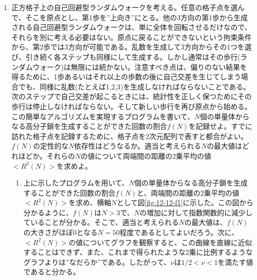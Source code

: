 \documentclass{jsarticle}
\begin{document}
        \begin{enumerate}
            \renewcommand{\labelenumi}{\alph{enumi}.}
            \renewcommand{\labelenumii}{}
            
            \item 正方格子上の自己回避型ランダムウォークを考える。任意の格子点を選んで、そこを原点とし、第1歩を”上向き”にとる。他の3方向の第1歩から生成される自己回避型ランダムウォークは、単に全体を回転させるだけなので、それらを別に考える必要はない。原点に戻ることができないという拘束条件から、第2歩では3方向が可能である。乱数を生成して3方向からその1つを選び、引き続く各ステップも同様にして生成する。しかし通常はその歩行(ランダムウォーク)は無限には続かない。注意すべき点は、偏りのない結果を得るために、1歩あるいはそれ以上の歩数の後に自己交差を生じてしまう場合でも、同様に乱数(たとえば1,2,3)を生成しなければならないことである。次のステップで自己交差が起こるときには、統計性を正しく保つためにその歩行は停止しなければならない。そして新しい歩行を再び原点から始める。この簡単なアルゴリズムを実現するプログラムを書いて、$N$個の単量体からなる高分子鎖を生成することができた回数の割合$f(N)$を記録せよ。すでに訪れた格子点を記録するために、格子点を2次元配列で表すと都合がよい。$f(N)$の定性的な$N$依存性はどうなるか。適当と考えられる$N$の最大値はどれほどか。それらの$N$の値について両端間の距離の2乗平均の値$<R^{2}(N)>$を求めよ。    
                
                \begin{enumerate}
                    \item 上に示したプログラムを用いて、$N$個の単量体からなる高分子鎖を生成することができた回数の割合$f(N)$と、両端間の距離の2乗平均の値$<R^{2}(N)>$を求め、横軸$N$として図\ref{fig:12-12-f1}に示した。この図から分かるように、$f(N)$は$N>3$で、$N$の増加に対して指数関数的に減少していることが分かる。そこで、適当と考えられる$N$の最大値は、$f(N)$の大きさがほぼ0となる$N=50$程度であるとしてよいだろう。次に、$<R^{2}(N)>$の値についてグラフを観察すると、この曲線を直線に近似することはできず、また、これまで得られたような2乗に比例するようなグラフよりは”なだらか”である。したがって、$\nu$は$1/2 <\nu< 1$を満たす値であると分かる。
                    

\end{enumerate}
\end{enumerate}
\end{document}
